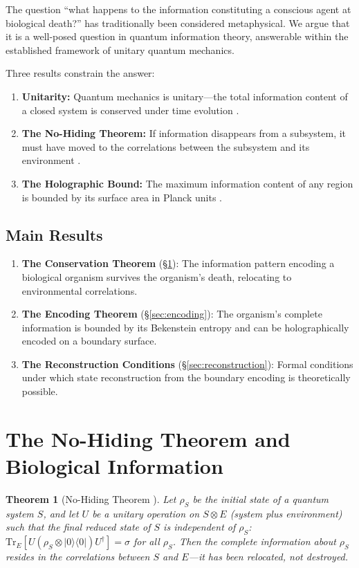 \documentclass[12pt, a4paper]{article}
\theoremstyle{plain}
\newtheorem{theorem}{Theorem}[section]
\theoremstyle{definition}
\theoremstyle{remark}
\begin{document}
The question ``what happens to the information constituting a conscious
agent at biological death?'' has traditionally been considered metaphysical.
We argue that it is a well-posed question in quantum information theory,
answerable within the established framework of unitary quantum mechanics.

Three results constrain the answer:
\begin{enumerate}[label=(\roman*)]
  \item \textbf{Unitarity:} Quantum mechanics is unitary---the total
    information content of a closed system is conserved under time
    evolution \citep{vonNeumann1932}.
  \item \textbf{The No-Hiding Theorem:} If information disappears from a
    subsystem, it must have moved to the correlations between the subsystem
    and its environment \citep{Braunstein2007}.
  \item \textbf{The Holographic Bound:} The maximum information content
    of any region is bounded by its surface area in Planck units
    \citep{Bekenstein1981, Bousso2002}.
\end{enumerate}

\subsection{Main Results}

\begin{enumerate}
  \item \textbf{The Conservation Theorem} (\S\ref{sec:conservation}):
    The information pattern encoding a biological organism survives
    the organism's death, relocating to environmental correlations.
  \item \textbf{The Encoding Theorem} (\S\ref{sec:encoding}):
    The organism's complete information is bounded by its Bekenstein
    entropy and can be holographically encoded on a boundary surface.
  \item \textbf{The Reconstruction Conditions} (\S\ref{sec:reconstruction}):
    Formal conditions under which state reconstruction from the
    boundary encoding is theoretically possible.
\end{enumerate}

\section{The No-Hiding Theorem and Biological Information}\label{sec:conservation}

\begin{theorem}[No-Hiding Theorem {\citep{Braunstein2007}}]\label{thm:nohiding}
  Let $\rho_S$ be the initial state of a quantum system $S$, and let
  $U$ be a unitary operation on $S \otimes E$ (system plus environment)
  such that the final reduced state of $S$ is independent of $\rho_S$:
  $\text{Tr}_E[U(\rho_S \otimes |0\rangle\langle 0|)U^\dagger] = \sigma$
  for all $\rho_S$. Then the complete information about $\rho_S$ resides
  in the correlations between $S$ and $E$---it has been \emph{relocated},
  not destroyed.
\end{theorem}
\end{document}
